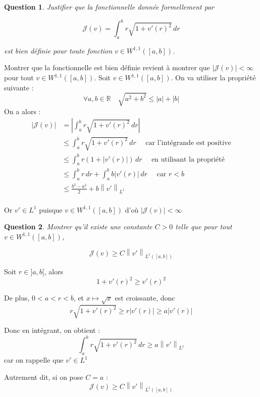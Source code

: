 \documentclass{article}
\newcommand{\Real}{ \mathbb{R} }
\newcommand{\Abs}[1]{ \left| #1 \right| }
\newcommand{\FunctionWithSqrt}[1]{ \sqrt{1 + #1 ^2} }
\newcommand{\Sobolev}[1]{ W^{1,1}\left( #1 \right) }
\newcommand{\Lebesgue}[1]{ L^{1}\left( #1 \right) }
\newcommand{\Norm}[2]{ \left\| #1 \right\|_{#2} }
\newcommand{\Integral}[4]{ \int_{#1}^{#2} #3 \, d#4 }
\newtheorem{question}{Question}[subsection]
\newenvironment{answer}
  {\color{blue}}
  {}
\newcommand{\QuestionAnswer}[2]{
    \begin{question}
        #1
    \end{question}
    \begin{answer}
        #2
    \end{answer}
}
\newcommand{\FunctionJ}{\mathcal{J}}
\begin{document}
\QuestionAnswer{
    Justifier que la fonctionnelle donnée formellement par
    
    $$\FunctionJ(v) = \Integral{a}{b}{r\FunctionWithSqrt{v'(r)}}{r}$$
    
    est bien définie pour toute fonction $v \in \Sobolev{[a, b]}$.
    
}{
    Montrer que la fonctionnelle est bien définie revient à montrer que $\Abs{\FunctionJ(v)} < \infty$ pour tout $v \in \Sobolev{[a, b]}$. \newline
    Soit $v \in \Sobolev{[a, b]}$. On va utiliser la propriété suivante :
    \begin{equation*}
        \forall a,b \in \Real \quad \sqrt{a^2+b^2} \leq \Abs{a} + \Abs{b}
    \end{equation*}
    On a alors :
    \begin{align*}
        \Abs{\FunctionJ(v)} &= \Abs{\Integral{a}{b}{r\FunctionWithSqrt{v'(r)}}{r}} \\
        &\leq \Integral{a}{b}{r\FunctionWithSqrt{v'(r)}}{r} \quad \text{ car l'intégrande est positive} \\
        &\leq \Integral{a}{b}{r ( 1 + \Abs{v'(r)})}{r} \quad \text{ en utilisant la propriété} \\
        &\leq \Integral{a}{b}{r}{r} + \Integral{a}{b}{b\Abs{v'(r)}}{r} \quad \text{ car } r < b\\
        &\leq \frac{b^2-a^2}{2} + b \Norm{v'}{L^1}\\
    \end{align*}

    Or $v' \in L^1$ puisque $v \in \Sobolev{[a, b]}$ d'où $\Abs{\FunctionJ(v)} < \infty$
}

\QuestionAnswer{
     Montrer qu'il existe une constante $C > 0$ telle que pour tout $v \in \Sobolev{[a, b]}$,
    
    $$\FunctionJ(v) \geq C \Norm{v'}{\Lebesgue{[a,b]}}$$
}{
    Soit $r \in ]a,b[$, alors
    $$1 + v'(r)^2 \geq v'(r)^2$$

    De plus, $0 < a < r < b$, et $x \mapsto \sqrt{x}$ est croissante, donc 
    $$r \FunctionWithSqrt{v'(r)} \geq r \Abs{v'(r)} \geq a \Abs{v'(r)} $$

    Donc en intégrant, on obtient :
    $$\Integral{a}{b}{r \FunctionWithSqrt{v'(r)}}{r} \geq a \Norm{v'}{L^1}$$
    car on rappelle que $v' \in L^1$

    Autrement dit, si on pose $C = a$ :
    $$\FunctionJ(v) \geq C \Norm{v'}{\Lebesgue{[a,b]}}$$

    
}
\end{document}
